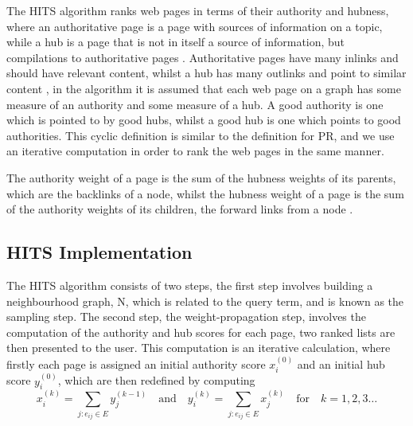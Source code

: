 \documentclass[11pt]{report}
\begin{document}
The HITS algorithm ranks web pages in terms of their authority and hubness, where an authoritative page is a page with sources of information on a topic, while a hub is a page that is not in itself a source of information, but compilations to authoritative pages \cite{manning}. Authoritative pages have many inlinks and should have relevant content, whilst a hub has many outlinks and point to similar content \cite{baeza1999modern}, in the algorithm it is assumed that each web page on a graph has some measure of an authority and some measure of a hub. A good authority is one which is pointed to by good hubs, whilst a good hub is one which points to good authorities. This cyclic definition is similar to the definition for PR, and we use an iterative computation in order to rank the web pages in the same manner.

The authority weight of a page is the sum of the hubness weights of its parents, which are the backlinks of a node, whilst the hubness weight of a page is the sum of the authority weights of its children, the forward links from a node \cite{baldi2003modeling}.

\subsection{HITS Implementation} \label{sec:HITS implementation}
The HITS algorithm consists of two steps, the first step involves building a neighbourhood graph, N, which is related to the query term, and is known as the sampling step. The second step, the weight-propagation step, involves the computation of the authority and hub scores for each page, two ranked lists are then presented to the user. This computation is an iterative calculation, where firstly each page is assigned an initial authority score $x_i^{(0)}$ and an initial hub score $y_i^{(0)}$, which are then redefined by computing \begin{equation} \label{eq:HITS1}
x_i^{(k)} = \displaystyle \sum_{j:e_{ij}\in E} y_j^{(k-1)} \quad\mathrm{and}\quad y_i^{(k)} = \displaystyle \sum_{j:e_{ij}\in E} x_j^{(k)}  \quad\mathrm{for}\quad k=1,2,3\ldots
\end{equation} 
\end{document}
